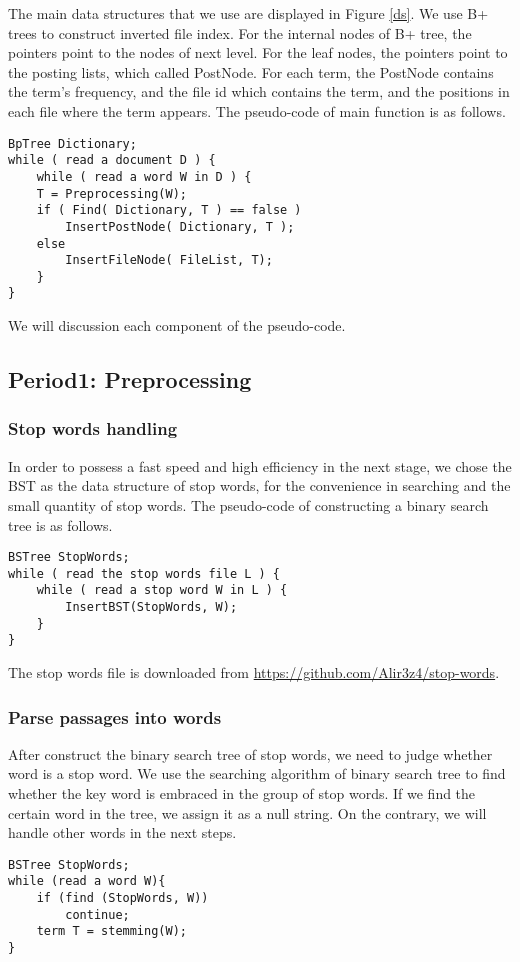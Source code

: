 \documentclass[12pt]{article}
\begin{document}
	The main data structures that we use are displayed in Figure \ref{ds}. We use B+ trees to construct inverted file index. For the internal nodes of B+ tree, the pointers point to the nodes of next level. For the leaf nodes, the pointers point to the posting lists, which called PostNode. For each term, the PostNode contains the term's frequency, and the file id which contains the term, and the positions in each file where the term appears. 
	The pseudo-code of main function is as follows.

\begin{lstlisting}
BpTree Dictionary;
while ( read a document D ) {
	while ( read a word W in D ) {
	T = Preprocessing(W);
	if ( Find( Dictionary, T ) == false )
		InsertPostNode( Dictionary, T );
	else 
		InsertFileNode( FileList, T);
	}
}
\end{lstlisting}
We will discussion each component of the pseudo-code. 
\subsection{Period1: Preprocessing}

\subsubsection{Stop words handling}
In order to possess a fast speed and high efficiency in the next stage, we chose the BST as the data structure of stop words, for the convenience in searching and the small quantity of stop words. The pseudo-code of constructing a binary search tree is as follows.
\begin{lstlisting}
BSTree StopWords;
while ( read the stop words file L ) {
	while ( read a stop word W in L ) {
		InsertBST(StopWords, W);
	}	
}
\end{lstlisting}

The stop words file is downloaded from \url{https://github.com/Alir3z4/stop-words}.

\subsubsection{Parse passages into words}
After construct the binary search tree of stop words, we need to judge whether word is a stop word. We use the searching algorithm of binary search tree to find whether the key word is embraced in the group of stop words. If we find the certain word in the tree, we assign it as a null string. On the contrary, we will handle other words in the next steps. 
\begin{lstlisting}
BSTree StopWords;
while (read a word W){
	if (find (StopWords, W))
		continue;
	term T = stemming(W);
}
\end{lstlisting}
\end{document}
